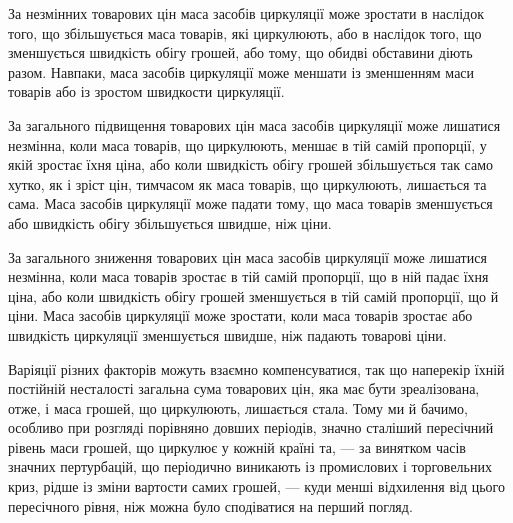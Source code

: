 За незмінних товарових цін маса засобів циркуляції може
зростати в наслідок того, що збільшується маса товарів, які
циркулюють, або в наслідок того, що зменшується швидкість
обігу грошей, або тому, що обидві обставини діють разом. Навпаки,
маса засобів циркуляції може меншати із зменшенням
маси товарів або із зростом швидкости циркуляції.

За загального підвищення товарових цін маса засобів циркуляції
може лишатися незмінна, коли маса товарів, що циркулюють,
меншає в тій самій пропорції, у якій зростає їхня ціна, або коли
швидкість обігу грошей збільшується так само хутко, як і зріст цін,
тимчасом як маса товарів, що циркулюють, лишається та сама.
Маса засобів циркуляції може падати тому, що маса товарів
зменшується або швидкість обігу збільшується швидше, ніж ціни.

За загального зниження товарових цін маса засобів циркуляції
може лишатися незмінна, коли маса товарів зростає в тій самій
пропорції, що в ній падає їхня ціна, або коли швидкість обігу
грошей зменшується в тій самій пропорції, що й ціни. Маса засобів
циркуляції може зростати, коли маса товарів зростає або швидкість
циркуляції зменшується швидше, ніж падають товарові ціни.

Варіяції різних факторів можуть взаємно компенсуватися,
так що наперекір їхній постійній несталості загальна сума товарових
цін, яка має бути зреалізована, отже, і маса грошей, що
циркулюють, лишається стала. Тому ми й бачимо, особливо при
розгляді порівняно довших періодів, значно сталіший пересічний
рівень маси грошей, що циркулює у кожній країні та, — за
винятком часів значних пертурбацій, що періодично виникають
із промислових і торговельних криз, рідше із зміни вартости
самих грошей, — куди менші відхилення від цього пересічного
рівня, ніж можна було сподіватися на перший погляд.

